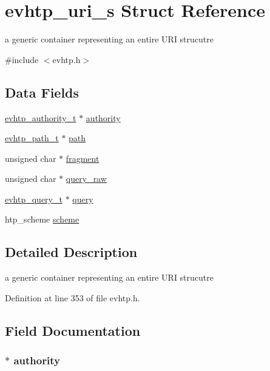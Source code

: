 \hypertarget{structevhtp__uri__s}{\section{evhtp\-\_\-uri\-\_\-s \-Struct \-Reference}
\label{structevhtp__uri__s}
}


a generic container representing an entire \-U\-R\-I strucutre  




{\ttfamily \#include $<$evhtp.\-h$>$}

\subsection*{\-Data \-Fields}
\begin{DoxyCompactItemize}
\item 
\hyperlink{evhtp_8h_a8421a0ba0361bdf9fa28292fe4e60a6f}{evhtp\-\_\-authority\-\_\-t} $\ast$ \hyperlink{structevhtp__uri__s_a733fe801dc0ac5ace86975d137f95e90}{authority}
\item 
\hyperlink{evhtp_8h_af31f4c3052c7f4ed6c3bfa32dceb332f}{evhtp\-\_\-path\-\_\-t} $\ast$ \hyperlink{structevhtp__uri__s_af5dec3b872833197fa6e19e681e8a50b}{path}
\item 
unsigned char $\ast$ \hyperlink{structevhtp__uri__s_a3c28c1d14341a7ab7ceb5600b7d353ae}{fragment}
\item 
unsigned char $\ast$ \hyperlink{structevhtp__uri__s_ab78fb0297ee5380de7fe7087c2dada1b}{query\-\_\-raw}
\item 
\hyperlink{evhtp_8h_aed08d04f28beb53e769bc25c2d382765}{evhtp\-\_\-query\-\_\-t} $\ast$ \hyperlink{structevhtp__uri__s_ade25f426b13f051ad7fe2feacbcdf44e}{query}
\item 
htp\-\_\-scheme \hyperlink{structevhtp__uri__s_ad585f48c56bdcc852338aa35466e3f8d}{scheme}
\end{DoxyCompactItemize}


\subsection{\-Detailed \-Description}
a generic container representing an entire \-U\-R\-I strucutre 

\-Definition at line 353 of file evhtp.\-h.



\subsection{\-Field \-Documentation}
\hypertarget{structevhtp__uri__s_a733fe801dc0ac5ace86975d137f95e90}{
\subsubsection[{authority}]{$\ast$ {\bf authority}}}\label{structevhtp__uri__s_a733fe801dc0ac5ace86975d137f95e90}



